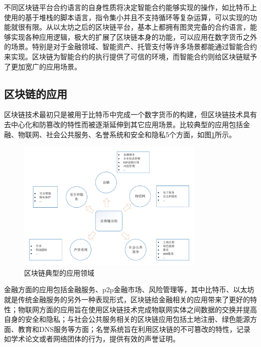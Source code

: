 不同区块链平台合约语言的自身性质将决定智能合约能够实现的操作，如比特币上使用的基于堆栈的脚本语言，指令集小并且不支持循环等复杂运算，可以实现的功能就很有限。从以太坊之后的区块链平台，基本上都拥有图灵完备的合约语言，能够实现各种应用逻辑，极大的扩展了区块链本身的功能，可以应用在数字货币之外的场景。特别是对于金融领域、智能资产、托管支付等许多场景都能通过智能合约来实现。区块链为智能合约的执行提供了可信的环境，而智能合约则给区块链赋予了更加宽广的应用场景。



\subsection{区块链的应用}

区块链技术最初只是被用于比特币中完成一个数字货币的构建，但区块链技术具有去中心化和防篡改的特性而被逐渐延伸到其它应用场景。比较典型的应用包括金融、物联网、社会公共服务、名誉系统和安全和隐私5个方面\supercite{zheng2016blockchain}，如图\ref{fig:applications}所示。

\begin{figure}[htbp]
 	\centering
 	\includegraphics[width = 0.8\textwidth]{img/applications}
 	\caption{区块链典型的应用领域}\label{fig:applications}
\end{figure}

金融方面的应用包括金融服务、p2p金融市场、风险管理等，其中比特币、以太坊就是传统金融服务的另外一种表现形式，区块链给金融相关的应用带来了更好的特性；物联网方面的应用旨在使用区块链技术完成物联网实体之间数据的交换并提高自身的安全和隐私；与社会公共服务相关的区块链应用包括土地注册、绿色能源方面、教育和DNS服务等方面；名誉系统旨在利用区块链的不可篡改的特性，记录如学术论文或者网络团体的行为，提供有效的声誉证明。


























